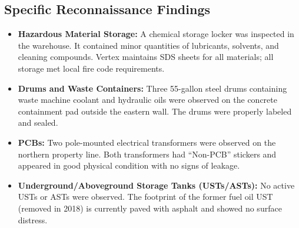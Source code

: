 \subsection{Specific Reconnaissance Findings}
\begin{itemize}
  \item \textbf{Hazardous Material Storage:} A chemical storage locker was inspected in the warehouse. It contained minor quantities of lubricants, solvents, and cleaning compounds. Vertex maintains SDS sheets for all materials; all storage met local fire code requirements.
  \item \textbf{Drums and Waste Containers:} Three 55-gallon steel drums containing waste machine coolant and hydraulic oils were observed on the concrete containment pad outside the eastern wall. The drums were properly labeled and sealed.
  \item \textbf{PCBs:} Two pole-mounted electrical transformers were observed on the northern property line. Both transformers had ``Non-PCB'' stickers and appeared in good physical condition with no signs of leakage.
  \item \textbf{Underground/Aboveground Storage Tanks (USTs/ASTs):} No active USTs or ASTs were observed. The footprint of the former fuel oil UST (removed in 2018) is currently paved with asphalt and showed no surface distress.
\end{itemize}

